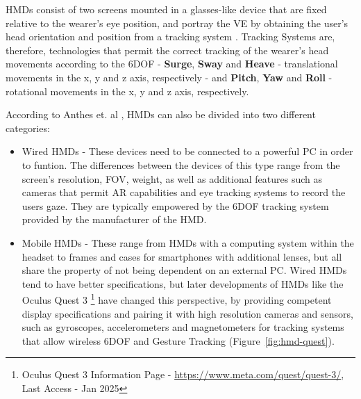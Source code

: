 \glspl{HMD} consist of two screens mounted in a glasses-like device that are fixed relative to
the wearer's eye position, and portray the \gls{VE} by obtaining the user's head
orientation and position from a tracking system \cite{Santos2009}. 
Tracking Systems are, therefore, technologies that permit the correct tracking 
of the wearer's head movements according to the \gls{6DOF} \cite{Anthes2016} - \textbf{Surge}, \textbf{Sway} and \textbf{Heave} 
- translational movements in the x, y and z axis, respectively 
- and \textbf{Pitch}, \textbf{Yaw} and \textbf{Roll} - rotational movements in the x, y and z axis, respectively.

According to Anthes et. al \cite{Anthes2016}, \glspl{HMD} can also be divided into two different categories:

\begin{itemize}

    \item Wired \glspl{HMD} - These devices need to be connected to a powerful \gls{PC} in order to funtion. 
    The differences between the devices of this type range from the screen's resolution, \gls{FOV}, weight, as well as 
    additional features such as cameras that permit \gls{AR} capabilities and eye tracking systems to record the users gaze.
    They are typically empowered by the \gls{6DOF} tracking system provided by the manufacturer of the \gls{HMD}. 

    \item Mobile \glspl{HMD} - These range from \glspl{HMD} with a computing system within the headset to frames and cases for 
    smartphones with additional lenses, but all share the property of not being dependent on an external \gls{PC}.
    Wired \glspl{HMD} tend to have better specifications, but later developments of \glspl{HMD} like the Oculus Quest 3
    \footnote{Oculus Quest 3 Information Page - \href{https://www.meta.com/quest/quest-3/}{https://www.meta.com/quest/quest-3/}, Last Access - Jan 2025 } have 
    changed this perspective, by providing competent display specifications and pairing it with high resolution cameras and sensors, such as 
    gyroscopes, accelerometers and magnetometers for tracking systems that allow wireless \gls{6DOF} and Gesture Tracking (Figure~\ref{fig:hmd-quest}).
\end{itemize}

